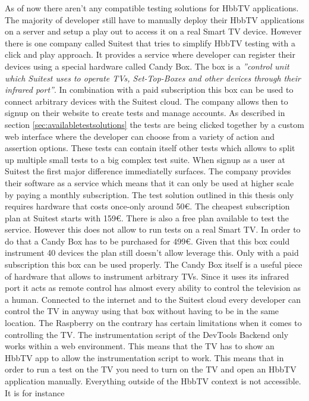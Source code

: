 As of now there aren't any compatible testing solutions for HbbTV applications. The majority of developer still have
to manually deploy their HbbTV applications on a server and setup a play out to access it on a real Smart TV device.
However there is one company called Suitest that tries to simplify HbbTV testing with a click and play approach.
It provides a service where developer can register their devices using a special hardware called Candy Box. The box
is a \textit{''control unit which Suitest uses to operate TVs, Set-Top-Boxes and other devices through their infrared
port''}\cite{candybox}. In combination with a paid subscription this box can be used to connect arbitrary devices
with the Suitest cloud. The company allows then to signup on their website to create tests and manage accounts.
As described in section \ref{sec:availabletestsolutions} the tests are being clicked together by a custom web interface
where the developer can choose from a variety of action and assertion options. These tests can contain itself other
tests which allows to split up multiple small tests to a big complex test suite.
When signup as a user at Suitest the first major difference immediatelly surfaces. The company provides their software
as a service which means that it can only be used at higher scale by paying a monthly subscription. The test solution
outlined in this thesis only requires hardware that costs once-only around 50\euro. The cheapest subscription plan
at Suitest starts with 159\euro. There is also a free plan available to test the service. However this does not allow
to run tests on a real Smart TV. In order to do that a Candy Box has to be purchased for 499\euro. Given that this
box could instrument 40 devices the plan still doesn't allow leverage this. Only with a paid subscription this box
can be used properly.
The Candy Box itself is a useful piece of hardware that allows to instrument arbitrary TVs. Since it uses its infrared
port it acts as remote control has almost every ability to control the television as a human. Connected to the internet
and to the Suitest cloud every developer can control the TV in anyway using that box without having to be in the same
location. The Raspberry on the contrary has certain limitations when it comes to controlling the TV. The instrumentation
script of the DevTools Backend only works within a web environment. This means that the TV has to show an HbbTV app
to allow the instrumentation script to work. This means that in order to run a test on the TV you need to turn on the
TV and open an HbbTV application manually. Everything outside of the HbbTV context is not accessible. It is for instance

